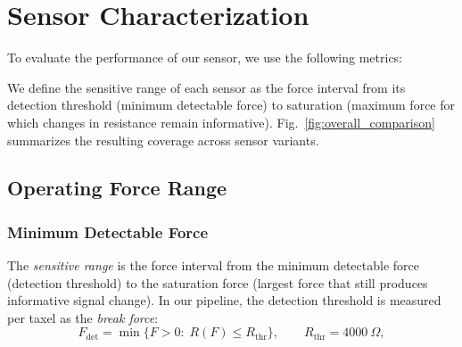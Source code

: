 \section{Sensor Characterization}
To evaluate the performance of our sensor, we use the following metrics:

We define the sensitive range of each sensor as the force interval from its detection threshold (minimum detectable force) to saturation (maximum force for which changes in resistance remain informative). Fig.~\ref{fig:overall_comparison} summarizes the resulting coverage across sensor variants.

\subsection{Operating Force Range} 
\subsubsection{Minimum Detectable Force}
The \emph{sensitive range} is the force interval from the minimum detectable force (detection threshold) to the saturation force (largest force that still produces informative signal change). In our pipeline, the detection threshold is measured per taxel as the \emph{break force}:
\[
F_{\mathrm{det}}=\min\{F>0:\; R(F)\le R_{\mathrm{thr}}\},\qquad R_{\mathrm{thr}}=4000~\Omega,
\]

